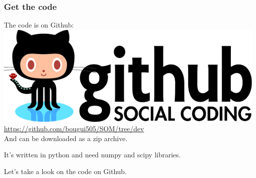 \begin{frame}
    \frametitle{Get the code}
    The code is on Github:
    \includegraphics[width=.5\textwidth]{figures/github.png}\\
    \href{https://github.com/bougui505/SOM/tree/dev}{https://github.com/bougui505/SOM/tree/dev}\\
    And can be downloaded as a zip archive.

    It's written in python and need numpy and scipy libraries.

    Let's take a look on the code on Github.
\end{frame}
